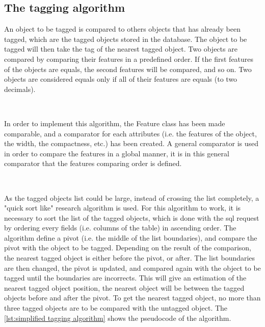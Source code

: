 

\subsection{The tagging algorithm}

An object to be tagged is compared to others objects that has already been tagged, which are the tagged objects stored in the database. The object to be tagged will then take the tag of the nearest tagged object. Two objects are compared by comparing their features in a predefined order. If the first features of the objects are equals, the second features will be compared, and so on. Two objects are considered equals only if all of their features are equals (to two decimals). 

~~

In order to implement this algorithm, the Feature class has been made comparable, and a comparator for each attributes (i.e. the features of the object, the width, the compactness, etc.) has been created. A general comparator is used in order to compare the features in a global manner, it is in this general comparator that the features comparing order is defined. 

~~

As the tagged objects list could be large, instead of crossing the list completely, a "quick sort like" research algorithm is used. For this algorithm to work, it is necessary to sort the list of the tagged objects, which is done with the sql request by ordering every fields (i.e. columns of the table) in ascending order. The algorithm define a pivot (i.e. the middle of the list boundaries), and compare the pivot with the object to be tagged. Depending on the result of the comparison, the nearest tagged object is either before the pivot, or after. The list boundaries are then changed, the pivot is updated, and compared again with the object to be tagged until the boundaries are incorrects. This will give an estimation of the nearest tagged object position, the nearest object will be between the tagged objects before and after the pivot. To get the nearest tagged object, no more than three tagged objects are to be compared with the untagged object. The \vref{lst:simplified tagging algorithm} shows the pseudocode of the algorithm.

